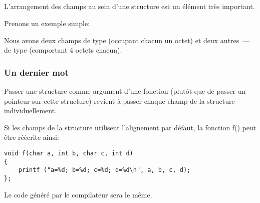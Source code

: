 ﻿\subsection{\StructurePackingSectionName}
\label{structure_packing}

L'arrangement des champs au sein d'une structure est un élément très important.

Prenons un exemple simple:



Nous avons deux champs de type \Tchar (occupant chacun un octet) et deux autres~---de type \Tint (comportant 4 octets chacun).





\subsubsection{Un dernier mot}

Passer une structure comme argument d'une fonction (plutôt que de passer un pointeur sur cette structure) 
revient à passer chaque champ de la structure individuellement.

Si les champs de la structure utilisent l'alignement par défaut, la fonction f() peut être réécrite ainsi:

\begin{lstlisting}[style=customc]
void f(char a, int b, char c, int d)
{
    printf ("a=%d; b=%d; c=%d; d=%d\n", a, b, c, d);
};
\end{lstlisting}

Le code généré par le compilateur sera le même.
